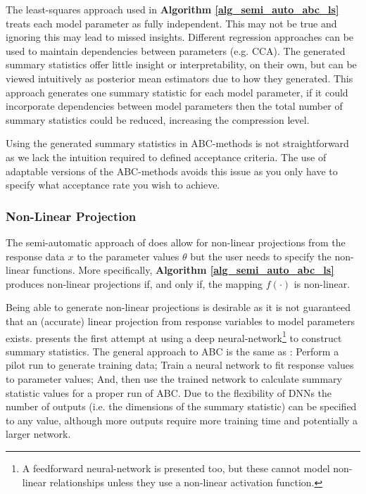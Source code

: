 \documentclass[11pt,a4paper]{article}
\theoremstyle{break}
\begin{document}
  \par The least-squares approach used in \textbf{Algorithm \ref{alg_semi_auto_abc_ls}} treats each model parameter as fully independent. This may not be true and ignoring this may lead to missed insights. Different regression approaches can be used to maintain dependencies between parameters (e.g. CCA). The generated summary statistics offer little insight or interpretability, on their own, but can be viewed intuitively as posterior mean estimators due to how they generated. This approach generates one summary statistic for each model parameter, if it could incorporate dependencies between model parameters then the total number of summary statistics could be reduced, increasing the compression level.

  \par Using the generated summary statistics in ABC-methods is not straightforward as we lack the intuition required to defined acceptance criteria. The use of adaptable versions of the ABC-methods avoids this issue as you only have to specify what acceptance rate you wish to achieve.


\subsubsection{Non-Linear Projection}\label{sec_non_linear_projection}

  The semi-automatic approach of \cite[]{constructing_summary_statistics_for_approximate_bayesian_computation_semi_automatic_ABC} does allow for non-linear projections from the response data $x$ to the parameter values $\theta$ but the user needs to specify the non-linear functions. More specifically, \textbf{Algorithm \ref{alg_semi_auto_abc_ls}} produces non-linear projections if, and only if, the mapping $f(\cdot)$ is non-linear.

  \par Being able to generate non-linear projections is desirable as it is not guaranteed that an (accurate) linear projection from response variables to model parameters exists. \cite[]{learning_summary_statistics_for_abc_via_dnn} presents the first attempt at using a deep neural-network\footnote{A feedforward neural-network is presented too, but these cannot model non-linear relationships unless they use a non-linear activation function.} to construct summary statistics. The general approach to ABC is the same as \cite[]{constructing_summary_statistics_for_approximate_bayesian_computation_semi_automatic_ABC}: Perform a pilot run to generate training data; Train a neural network to fit response values to parameter values; And, then use the trained network to calculate summary statistic values for a proper run of ABC. Due to the flexibility of DNNs the number of outputs (i.e. the dimensions of the summary statistic) can be specified to any value, although more outputs require more training time and potentially a larger network.
\end{document}
